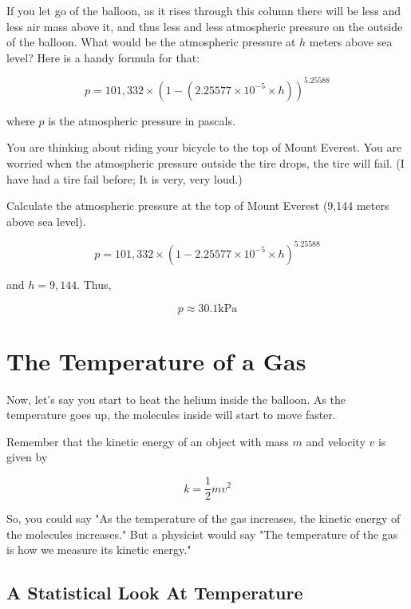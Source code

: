 If you let go of the balloon, as it rises through this column there will be less and less air mass above it, and thus less and less atmospheric pressure on the outside of the balloon. 
What would be the atmospheric pressure at $h$ meters above sea level?  Here is a handy formula for that:

$$p = 101,332 \times \left(1 - \left( 2.25577 \times 10^{-5} \times h\right) \right)^{5.25588}$$

where $p$ is the atmospheric pressure in pascals.

\begin{Exercise}[title={Atmospheric Pressure},  label=atmos_pressure]
  
You are thinking about riding your bicycle to the top of Mount Everest.  You are worried when the atmospheric pressure outside the tire drops,  the tire will fail.  
(I have had a tire fail before; It is very, very loud.)  

Calculate the atmospheric pressure at the top of Mount Everest (9,144 meters above sea level).

\end{Exercise}
\begin{Answer}[ref=atmos_pressure]

$$p = 101,332 \times \left(1 - 2.25577 \times 10^{-5} \times h\right)^{5.25588}$$

and $h = 9,144$.  Thus,

$$p \approx 30.1 \text{kPa}$$

\end{Answer}

\section{The Temperature of a Gas}

Now,  let's say you start to heat the helium inside the balloon.  As the temperature goes up,  the molecules inside will start to move faster.

Remember that the kinetic energy of an object with mass $m$ and velocity $v$ is given by

$$k = \frac{1}{2} m v^2$$

So, you could say "As the temperature of the gas increases,  the kinetic energy of the molecules increases."   But a physicist would say "The temperature of the gas is how we measure its kinetic energy."

\subsection{A Statistical Look At Temperature}

